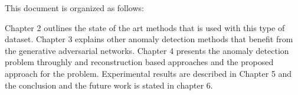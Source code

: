 
\begingroup
\text{\color{red}{Introduction will be written}}

\lipsum[1-5]
This document is organized as follows:

Chapter 2 outlines the state of the art methods that is used with this type of 
dataset. Chapter 3 explains other anomaly detection methods that benefit from the
generative adversarial networks. Chapter 4 presents the anomaly detection problem 
throughly and reconstruction based approaches and the proposed approach for the 
problem. Experimental results are described in Chapter 5 and the conclusion and 
the future work is stated in chapter 6.

\endgroup